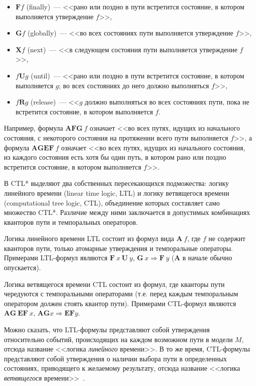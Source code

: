\documentclass[a4paper,notitlepage,14pt]{article}
\begin{document}
\begin{itemize}
\item $\mathbf{F} f$ (finally)~--- <<рано или поздно в пути встретится состояние, в котором
  выполняется утверждение $f$>>,
\item $\mathbf{G} f$ (globally)~--- <<во всех состояниях пути выполняется утверждение
  $f$>>,
\item $\mathbf{X} f$ (next)~--- <<в следующем состояния пути выполняется утверждение
  $f$>>,
\item $f \mathbf{U} g$ (until)~--- <<рано или поздно в пути встретится состояние, в
  котором выполняется $g$; во всех состояниях до него должно выполняться $f$>>,
\item $f \mathbf{R} g$ (release)~--- <<$g$ должно выполняться во всех состояниях пути,
  пока не встретится состояние, в котором выполняется $f$.
\end{itemize}

Например, формула $\mathbf{AFG}~ f$ означает <<во всех путях, идущих из начального
состояния, с некоторого состояния на протяжении всего пути выполняется $f$>>, а формула
$\mathbf{AGEF}~ f$ означает <<во всех путях, идущих из начального состояния, из каждого
состояния есть хотя бы один путь, в котором рано или поздно встретится состояние, в
котором выполняется $f$>>.

В CTL* выделяют два собственных пересекающихся подможества: логику линейного времени
(linear time logic, LTL) и логику ветвящегося времени (computational tree logic, CTL),
объединение которых составляет само множество CTL*. Различие между ними заключается в
допустимых комбинациях кванторов пути и темпоральных операторов.

Логика линейного времени LTL состоит из формул вида $\mathbf{A}~f$, где $f$ не содержит
кванторов пути, только атомарные утверждения и темпоральные операторы. Примерами
LTL-формул являются $\mathbf{F}~x~\mathbf{U}~y$, $\mathbf{G}~x \Rightarrow \mathbf{F}~y$
($\mathbf{A}$ в начале обычно опускается).

Логика ветвящегося времени CTL состоит из формул, где кванторы пути чередуются с
темпоральными операторами (т.е. перед каждым темпоральным оператором должен стоять квантор
пути). Примерами CTL-формул являются $\mathbf{AG}~\mathbf{EF}~x$, $\mathbf{AG} x
\Rightarrow \mathbf{EF} y$.

Можно сказать, что LTL-формулы представляют собой утверждения относительно событий,
происходящих на каждом возможном пути в модели $M$, отсюда название <<логика
\emph{линейного} времени>>. В то же время, CTL-формулы представляют собой утверждения о
наличии выбора пути в определенных состояниях, приводящего к желаемому результату, отсюда
название <<логика \emph{ветвящегося} времени>>~\cite{Clarke}.
\end{document}
